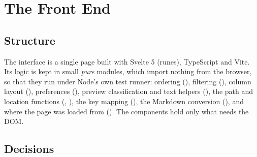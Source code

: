 \section{The Front End}

\subsection{Structure}

The interface is a single page built with Svelte 5 (runes), TypeScript and Vite.  Its
logic is kept in small \emph{pure} modules, which import nothing from the browser, so that
they run under Node's own test runner: ordering (), filtering (),
column layout (), preferences (), preview classification and text
helpers (), the path and location functions (, ),
the key mapping (), the Markdown conversion (), and where the page was
loaded from ().  The components hold only what needs the DOM.

\subsection{Decisions}

